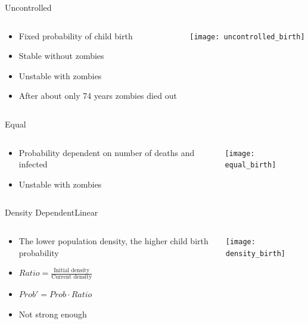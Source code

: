 \documentclass{beamer}
\begin{document}
\begin{frame}{Uncontrolled}
    \begin{columns}
        \begin{column}{0.4\textwidth}
            \begin{itemize}
                \item Fixed probability of child birth
                \item Stable without zombies
                \item Unstable with zombies
                \item After about only 74 years zombies died out
            \end{itemize}
        \end{column}
        \begin{column}{0.6\textwidth}
            \texttt{[image: uncontrolled\_birth]}
        \end{column}
    \end{columns}
\end{frame}

\begin{frame}{Equal}
    \begin{columns}
        \begin{column}{0.4\textwidth}
            \begin{itemize}
                \item Probability dependent on number of deaths and infected
                \item Unstable with zombies
            \end{itemize}
        \end{column}
        \begin{column}{0.6\textwidth}
            \texttt{[image: equal\_birth]}
        \end{column}
    \end{columns}
\end{frame}

\begin{frame}{Density Dependent}{Linear}
    \begin{columns}
        \begin{column}{0.4\textwidth}
            \begin{itemize}
                \item The lower population density, the higher child birth probability
                \item $Ratio = \frac{\text{Initial density}}{\text{Current density}}$
                \item $Prob' = Prob \cdot Ratio$
                \item Not strong enough
            \end{itemize}
        \end{column}
        \begin{column}{0.6\textwidth}
            \texttt{[image: density\_birth]}
        \end{column}
    \end{columns}
\end{frame}
\end{document}

